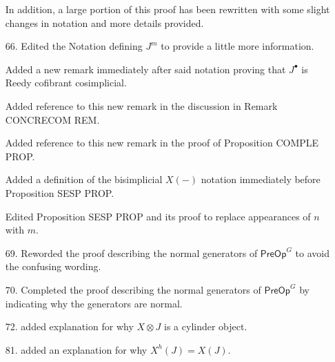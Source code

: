 \documentclass{article}
\begin{document}
\begin{itemize}
In addition, a large portion of this proof has been rewritten with some slight changes in notation and more details provided.

\item[66.] Edited the Notation defining $J^m$ to provide a little more information.

Added a new remark immediately after said notation proving that $J^{\bullet}$ is Reedy cofibrant cosimplicial.

Added reference to this new remark in the discussion in Remark CONCRECOM REM.

Added reference to this new remark in the proof of Proposition COMPLE PROP.

Added a definition of the bisimplicial $X(-)$ notation immediately before Proposition SESP PROP.

Edited Proposition SESP PROP and its proof to replace appearances of $n$ with $m$.

\item[69.] Reworded the proof describing the normal generators of $\mathsf{PreOp}^G$ to avoid the confusing wording.

\item[70.] Completed the proof describing the normal generators of $\mathsf{PreOp}^G$ by indicating why the generators are normal.

\item[72.] added explanation for why $X \otimes J$ is a cylinder object.

\item[81.] added an explanation for why $X^h(J) = X(J)$.
\end{itemize}
\end{document}
